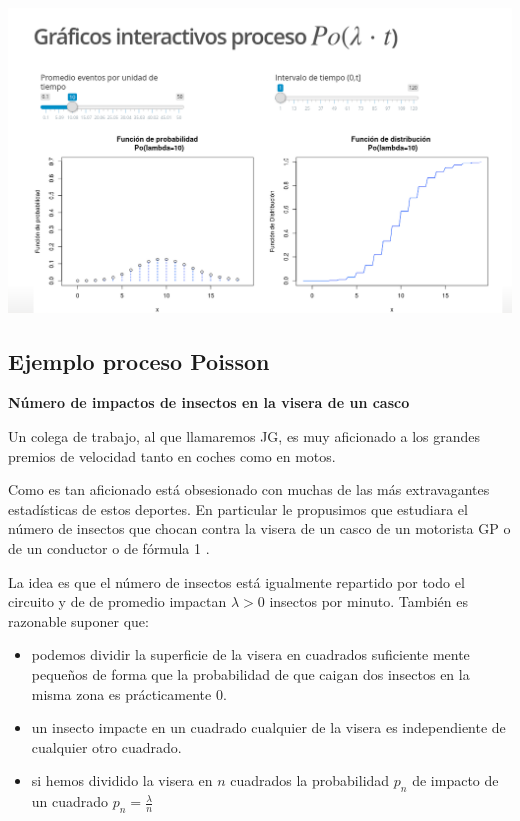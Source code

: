 \documentclass[]{book}
\providecommand{\tightlist}{%
  \setlength{\itemsep}{0pt}\setlength{\parskip}{0pt}}
\begin{document}
\includegraphics{Images/noshinyImages/interactivos_proceso_poisson1.png}

\hypertarget{ejemplo-proceso-poisson}{%
\subsection{Ejemplo proceso Poisson}\label{ejemplo-proceso-poisson}}

\textbf{Número de impactos de insectos en la visera de un casco}

Un colega de trabajo, al que llamaremos JG, es muy aficionado a los grandes premios de velocidad tanto en coches como en motos.

Como es tan aficionado está obsesionado con muchas de las más extravagantes estadísticas de estos deportes.
En particular le propusimos que estudiara el número de insectos que chocan contra la visera de un casco de un motorista GP o de un conductor o de fórmula 1 .

La idea es que el número de insectos está igualmente repartido por todo el circuito y de de promedio impactan \(\lambda>0\) insectos por minuto. También es razonable suponer que:

\begin{itemize}
\tightlist
\item
  podemos dividir la superficie de la visera en cuadrados suficiente mente pequeños de forma que la probabilidad de que caigan dos insectos en la misma zona es prácticamente 0.
\item
  un insecto impacte en un cuadrado cualquier de la visera es independiente de cualquier otro cuadrado.
\item
  si hemos dividido la visera en \(n\) cuadrados la probabilidad \(p_n\) de impacto de un cuadrado \(p_n=\frac{\lambda}{n}\)
\end{itemize}
\end{document}
